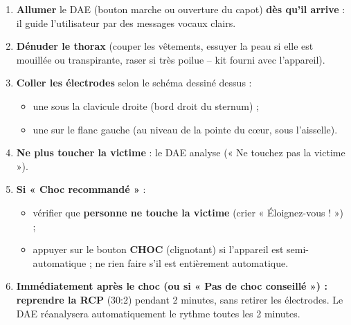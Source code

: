 \documentclass[11pt]{article}
\begin{document}
\begin{methode}
\begin{enumerate}
    \item \textbf{Allumer} le DAE (bouton marche ou ouverture du capot) \textbf{dès qu'il arrive} : il guide l'utilisateur par des messages vocaux clairs.
    \item \textbf{Dénuder le thorax} (couper les vêtements, essuyer la peau si elle est mouillée ou transpirante, raser si très poilue -- kit fourni avec l'appareil).
    \item \textbf{Coller les électrodes} selon le schéma dessiné dessus :
    \begin{itemize}
        \item une sous la clavicule droite (bord droit du sternum) ;
        \item une sur le flanc gauche (au niveau de la pointe du cœur, sous l'aisselle).
    \end{itemize}
    \item \textbf{Ne plus toucher la victime} : le DAE analyse (« Ne touchez pas la victime »).
    \item \textbf{Si « Choc recommandé »} :
    \begin{itemize}
        \item vérifier que \textbf{personne ne touche la victime} (crier « Éloignez-vous ! ») ;
        \item appuyer sur le bouton \textbf{CHOC} (clignotant) si l'appareil est semi-automatique ; ne rien faire s'il est entièrement automatique.
    \end{itemize}
    \item \textbf{Immédiatement après le choc (ou si « Pas de choc conseillé ») : reprendre la RCP} (30:2) pendant 2 minutes, sans retirer les électrodes. Le DAE réanalysera automatiquement le rythme toutes les 2 minutes.
\end{enumerate}
\end{methode}
\end{document}
